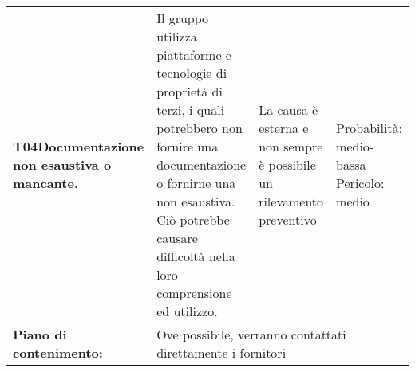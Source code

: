 \begin{longtable}{>{\bfseries}p{2.5cm} p{4.5cm} p{4.5cm} p{2.5cm}}
		\hline
		T04\newline Documentazione non esaustiva o mancante. 
		& Il gruppo utilizza piattaforme e tecnologie di proprietà di terzi, i quali potrebbero non fornire una documentazione o fornirne una non esaustiva. Ciò potrebbe causare difficoltà nella loro comprensione ed utilizzo.
		& La causa è esterna e non sempre è possibile un rilevamento preventivo
		& Probabilità: medio-bassa \newline Pericolo: medio \\
		\rowcolor{LightGray}
		Piano di contenimento: 
		& \multicolumn{3}{p{12.5cm}}{Ove possibile, verranno contattati direttamente i fornitori}\\[0.5cm]
		
\end{longtable}